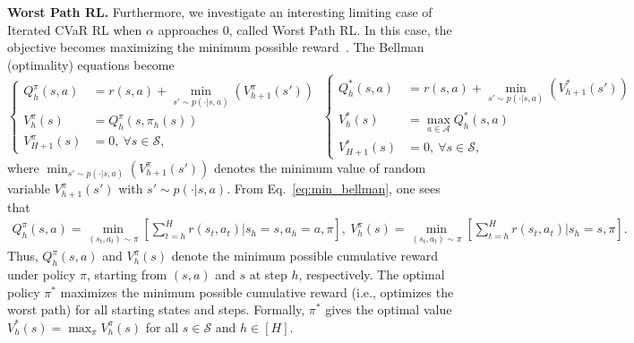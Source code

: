 \documentclass{article} %
\newcommand{\cA}{\mathcal{A}}
\newcommand{\cS}{\mathcal{S}}
\newcommand{\mbr}[1]{\left[ #1 \right]}
\newcommand{\longbo}[1]{}
\newcommand{\yihan}[1]{}
\newcommand{\longbo}[1]{{\color{red}  [\text{Longbo:} #1]}}
\newcommand{\yihan}[1]{{\color{teal} [\text{Yihan:} #1]}}
\begin{document}
	\textbf{Worst Path RL.}
	Furthermore, we investigate an interesting limiting case of Iterated CVaR RL when $\alpha$ approaches $0$, called Worst Path RL. In this case,  the objective  becomes maximizing the minimum possible reward~\citep{heger1994consideration}. %
	The Bellman (optimality) equations become  %
	\begin{equation}
		\left\{
		\begin{aligned}
			Q^{\pi}_h(s,a)&= r(s,a)+ \min_{s' \sim p(\cdot|s,a)}(V^{\pi}_{h+1}(s'))
			\\
			V^{\pi}_h(s)&=Q^{\pi}_h(s,\pi_h(s))  
			\\
			V^{\pi}_{H+1}(s)&=0, \ \forall s \in \cS ,
		\end{aligned}
		\right.
		\ 
		\left\{
		\begin{aligned}
			Q^{*}_h(s,a)&= r(s,a)+ \min_{s' \sim p(\cdot|s,a)}(V^{*}_{h+1}(s'))
			\\
			V^{*}_h(s)&= \max_{a \in \cA} Q^{*}_h(s,a)
			\\
			V^{*}_{H+1}(s)&=0, \ \forall s \in \cS ,
		\end{aligned}
		\right. \label{eq:min_bellman}
	\end{equation}
	where $\min_{s' \sim p(\cdot|s,a)}(V^{\pi}_{h+1}(s'))$ denotes the minimum value of random variable $V^{\pi}_{h+1}(s')$ with $s' \sim p(\cdot|s,a)$. 
	From Eq.~\eqref{eq:min_bellman}, one sees that
	\begin{align*}
		Q^{\pi}_h(s,a) = \!\!\! \min_{(s_t,a_t) \sim \pi} \!\! \mbr{ \sum_{t=h}^{H} r(s_t,a_t) \Big| s_h=s,a_h=a,\pi } \!,
		\ 
		V^{\pi}_h(s) = \!\!\! \min_{(s_t,a_t) \sim \pi} \!\! \mbr{ \sum_{t=h}^{H} r(s_t,a_t) \Big| s_h=s,\pi } \!.
	\end{align*}
	Thus,   $Q^{\pi}_h(s,a)$ and $V^{\pi}_h(s)$ denote the minimum possible cumulative reward under policy $\pi$, starting from $(s,a)$ and $s$ at step $h$, respectively.  The optimal policy $\pi^{*}$ maximizes the minimum possible cumulative reward (i.e., optimizes the worst path) for all starting states and steps. Formally, $\pi^{*}$ gives the optimal value $V^{*}_h(s)=\max_{\pi} V^{\pi}_h(s)$ for all $s \in \cS$ and $h \in [H]$.
	
\end{document}
